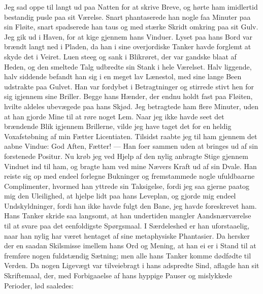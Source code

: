 \documentclass[12pt]{article}
\newcommand{\apage}[1]{\marginnote{\footnotesize\textit{[#1]}}}
\begin{document}
Jeg sad oppe til langt ud paa Natten for at skrive Breve, og hørte
ham imidlertid bestandig pusle paa sit Værelse. Snart phantaserede han
nogle faa Minuter paa sin Fløite, snart spadserede han taus og med
stærke Skridt omkring paa sit Gulv. Jeg gik ud i Haven, for at kige
gjennem hans Vinduer. Lyset paa hans Bord var brændt langt ned i
Pladen, da han i sine overjordiske Tanker havde forglemt at skyde det
i Veiret. Luen steeg og sank i Blikrøret, der var gandske blaat af
Heden, og den smeltede Talg udbredte sin Stank i hele Værelset. Halv
liggende, halv siddende befandt han sig i en meget lav Lænestol, med
sine lange Been udstrakte paa Gulvet. Han var fordybet i Betragtninger
og stirrede stivt hen for sig igjennem sine Briller. Begge hans
Hænder, der endnu holdt fast paa Fløiten, hvilte aldeles ubevægede paa
hans Skjød. Jeg betragtede ham flere Minuter, uden at han gjorde Mine
til at røre noget Lem. Naar jeg ikke havde seet det brændende Blik
igjennem Brillerne, vilde jeg have taget det for en heldig Voxafstøbning
af min Fætter Licentiaten. Tilsidst raabte jeg til ham gjennem det
aabne Vindue: God Aften, Fætter! --- Han foer sammen uden at bringes
ud af sin forstenede Positur. Nu krøb jeg ved Hjelp af den nylig
anbragte Stige gjennem Vinduet ind til ham, og bragte ham ved mine
Nævers Kraft ud af sin Dvale. Han reiste sig op med endeel forlegne
Bukninger og fremstammede nogle ufuldbaarne Complimenter, hvormed han
yttrede sin Taksigelse, fordi jeg saa gjerne paatog mig den Uleilighed,
at hjelpe lidt paa hans Leveplan, og gjorde mig endeel Undskyldninger,
fordi han ikke havde fulgt den Bane, jeg havde foreskrevet ham. Hans
Tanker skride saa langsomt, at han undertiden mangler Aandsnærværelse
til at svare paa det eenfoldigste Spørgsmaal. I Særdeleshed er han
uforstaaelig, naar han nylig har været hentaget af sine metaphysiske \apage{91}
Phantasier. Da hersker der en saadan Skilsmisse imellem hans Ord og
Mening, at han ei er i Stand til at fremføre nogen fuldstændig
Sætning; men alle hans Tanker komme dødfødte til Verden. Da nogen
Ligevægt var tilveiebragt i hans adspredte Sind, aflagde han sit
Skriftemaal, der, med Forbigaaelse af hans hyppige Pauser og mislykkede
Perioder, lød saaledes:
\end{document}
